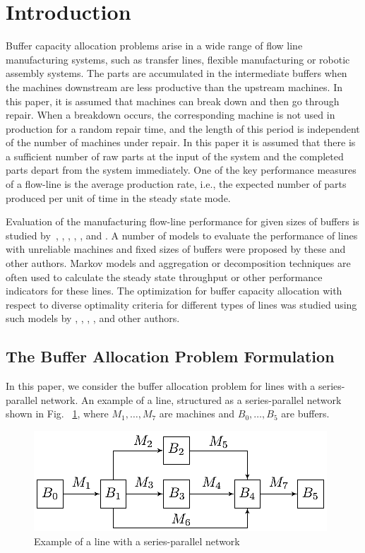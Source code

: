 \documentclass{ifacconf}
\begin{document}
\section{Introduction}

Buffer  capacity  allocation  problems  arise  in  a  wide  range  of  flow line manufacturing  systems, 
such  as  transfer  lines,  flexible  manufacturing  or  robotic  assembly  systems. 
The parts are accumulated in the intermediate buffers when the machines downstream are less productive than the upstream machines. 
In this paper, it is assumed that machines can break down and then go through repair. When a breakdown occurs, the corresponding 
machine is not used in production for a random repair time, and the length of this period is independent of the 
number of machines under repair. In this paper it is assumed  that there is a sufficient number of raw parts at 
the input of the system and the completed parts depart 
from the system immediately. One of the key performance measures of a flow-line is 
the average production rate, i.e., the expected number of parts produced per 
unit of time in the steady state mode.

Evaluation  of the manufacturing flow-line performance for given sizes of buffers is studied 
by~\cite{Proth84}, \cite{DG92}, \cite{Gershwin1993}, \cite{HPB1993}, \cite{Meerkov2009}, and \cite{TanGer09}. A number of
 models to evaluate the performance of lines with unreliable machines and fixed sizes of buffers were proposed by these and other authors. 
Markov models and aggregation or decomposition techniques are often used to calculate the
steady state throughput or other performance indicators for these lines.  
The  optimization  for  buffer  capacity  allocation with 
respect to diverse optimality criteria for different types of lines was studied 
using such models by \cite{SmiDas88}, \cite{So97}, \cite{GS}, \cite{Khelil_21}, \cite{ShiGer2009} and other authors. 

\subsection{The Buffer Allocation Problem Formulation} \label{bap_formulation}

In this paper, we consider the buffer allocation problem for lines with a series-parallel network. 
An example of a line, structured as a series-parallel network shown in Fig. ~\ref{lineexample}, where $M_1,…,M_7$ are machines and $B_0,…,B_5$ are buffers.

 \begin{figure}[h!]
	\centering
	\includegraphics[scale=0.7]{LineSchems}
  \caption{Example of a line with a series-parallel network\label{lineexample}}
  \end{figure}
\end{document}
